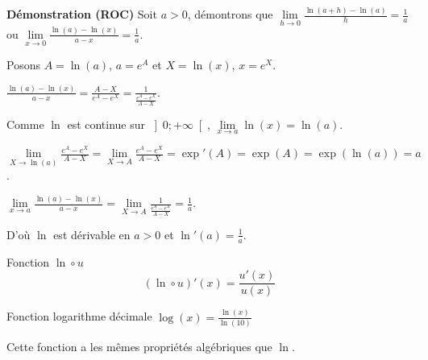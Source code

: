 \begin{bclogo}{\textbf{Démonstration (ROC)}}  
Soit $a>0$, démontrons que $\lim\limits_{h\to 0}\frac{\ln (a+h)-\ln (a)}{h}=\frac{1}{a}$ ou $\lim\limits_{x\to 0}\frac{\ln (a)-\ln (x)}{a-x}=\frac{1}{a}$.

\vspace{0.3cm}

Posons $A=\ln (a)$, $a=e^A$ et $X=\ln (x)$, $x=e^X$.

\vspace{0.3cm}

$\frac{\ln (a)-\ln (x)}{a-x}=\frac{A-X}{e^A-e^X}=\frac{1}{\frac{e^A-e^X}{A-X}}$.

\vspace{0.3cm}

Comme $\ln$ est continue sur $\left] 0;+\infty\right[$, $\lim\limits_{x\to a} \ln (x)=\ln (a)$.

\vspace{0.3cm}

$\lim\limits_{X\to \ln (a)} \frac{e^A-e^X}{A-X}= \lim\limits_{X\to A} \frac{e^A-e^X}{A-X}=\exp '(A)=\exp (A)=\exp (\ln (a))=a$.

\vspace{0.3cm}

$\lim\limits_{x\to a} \frac{\ln (a)-\ln (x)}{a-x}=\lim\limits_{X\to A} \frac{1}{\frac{e^A-e^X}{A-X}}=\frac{1}{a}$.

\vspace{0.3cm}

D'où $\ln$ est dérivable en $a>0$ et $\ln '(a)=\frac{1}{a}$.
\end{bclogo}

\medskip

\begin{bclogo}{Fonction $\ln \circ u$}
\[(\ln \circ u)'(x)=\frac{u'(x)}{u(x)}\]
\end{bclogo}

\medskip

\begin{bclogo}{Fonction logarithme décimale}
$\log(x)=\frac{\ln (x)}{\ln (10)}$

Cette fonction a les mêmes propriétés algébriques que $\ln$.
\end{bclogo}






